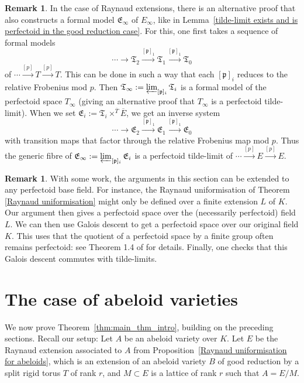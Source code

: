 \documentclass[10pt,oneside]{amsart}
\theoremstyle{definition}
\newtheorem{remark}[theorem]{Remark}
\begin{document}
	\begin{remark}
		In the case of Raynaud extensions, there is an alternative proof that also constructs a formal model $\mathfrak E_\infty$ of $E_\infty$, like in Lemma~\ref{tilde-limit exists and is perfectoid in the good reduction case}. For this, one first takes a sequence of formal models 
		\[\cdots \to \mathfrak T_{2}\xrightarrow{[\mathfrak p]_1}\mathfrak T_1\xrightarrow{[\mathfrak p]_1} \mathfrak T_0\]
		of $\cdots\xrightarrow{[p]} T\xrightarrow{[p]} T$. This can be done in such a way that each $[\mathfrak p]_i$ reduces to the relative Frobenius mod $p$. Then $\mathfrak T_\infty:=\varprojlim_{[\mathfrak p]_i}\mathfrak T_i$ is a formal model of the perfectoid space $T_\infty$ (giving an alternative proof that $T_\infty$ is a perfectoid tilde-limit). When we set $\mathfrak E_i:=\mathfrak T_i\times^{\overline{T}}\overline{E}$, we get an inverse system
		\[\cdots \to \mathfrak E_{2}\xrightarrow{[\mathfrak p]_1}\mathfrak E_1\xrightarrow{[\mathfrak p]_1} \mathfrak E_0\]
		with transition maps that factor through the relative Frobenius map mod $p$. Thus the generic fibre of $\mathfrak E_\infty:=\varprojlim_{[\mathfrak p]_i}\mathfrak E_i$ is a perfectoid tilde-limit of $\cdots \xrightarrow{[p]}E\xrightarrow{[p]}E$.
	\end{remark}
	
	\begin{remark}\label{general fields for E}
	With some work, the arguments in this section can be extended to any perfectoid base field. For instance, the Raynaud uniformisation of Theorem \ref{Raynaud uniformisation} might only be defined over a finite extension $L$ of $K$. Our argument then gives a perfectoid space over the (necessarily perfectoid) field $L$. We can then use Galois descent to get a perfectoid space over our original field $K$. This uses that the quotient of a perfectoid space by a finite group often remains perfectoid: see Theorem 1.4 of \cite{Hansen_quotients} for details. Finally, one checks that this Galois descent commutes with tilde-limits. 
	\end{remark}

	
	\section{The case of abeloid varieties}\label{The case of abeloid varieties}
	We now prove Theorem~\ref{thm:main_thm_intro}, building on the preceding sections. Recall our setup: Let $A$ be an abeloid variety over $K$. Let $E$ be the Raynaud extension associated to $A$ from Proposition~\ref{Raynaud uniformisation for abeloids}, which is an extension of an abeloid variety $B$ of good reduction by a split rigid torus $T$ of rank $r$, and $M\subset E$  is a lattice of rank $r$ such that $A=E/M$. 
\end{document}

